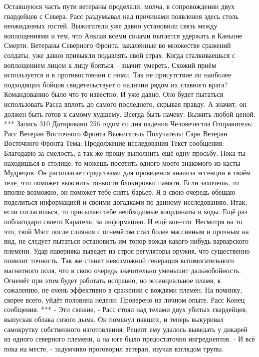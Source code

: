\documentclass[a4paper, 12pt]{report}
\begin{document}
Оставшуюся часть пути ветераны проделали, молча, в сопровождении двух гвардейцев с Севера. Расс раздумывал над причинами появления здесь столь неожиданных гостей. Выжигатели уже давно установили связь между воплощениями и тем, что Анклав всеми силами пытается удержать в Каньоне Смерти. Ветераны Северного Фронта, закалённые во множестве сражений солдаты, уже давно привыкли подавлять свой страх. Когда сталкиваешься с воплощением лицом к лицу бояться – значит умереть. Схожий приём используется и в противостоянии с ними. Так не присутствие ли наиболее подходящих бойцов свидетельствует о наличии рядом их главного врага? Командованию было что-то известно. И уже давно. Оно будет пытаться использовать Расса вплоть до самого последнего, скрывая правду. А значит, он должен быть готов к самому худшему. 
Всегда быть начеку. Выжить любой ценой.
***
Запись 310
Датировано 256 годом со дня падения Человечества
Отправитель: Расс Ветеран Восточного Фронта Выжигатель
Получатель: Сарн Ветеран Восточного Фронта
Тема: Продолжение исследования
Текст сообщения:	
	Благодарю за смелость, а так же прошу выполнить ещё одну просьбу. Пока ты находишься в столице, то можешь посетить одного моего знакомого из касты Мудрецов. Он располагает средствами для проведения анализа эссенции в твоём теле, что поможет выяснить тонкости блокировки памяти. Если захочешь, то вполне возможно, он поможет тебе снять барьер. Я в свою очередь обещаю поделиться информацией и своими догадками по данному исследованию. 
Итак, если согласишься, то присылаю тебе необходимые координаты и коды.
Ещё раз поблагодари своего Карателя, за информацию.
	И ещё кое-что. Несмотря на то что, твой Мэгг после слияния с огнемётом стал более массивным и прочным на вид, не следует пытаться остановить им топор вождя какого-нибудь варварского племени. Удар наверняка выведет из строя регуляторы оружия, что существенно понизит точность. Так же станет невозможной генерация вспомогательного магнитного поля, что в свою очередь значительно уменьшит дальнобойность. Огнемёт при этом будет работать исправно, но эссенциальное пламя, к сожалению, не очень эффективно в сражении с вождями племён. На починку, скорее всего, уйдёт половина недели. 
Проверено на личном опыте.
Расс
Конец сообщения. 
***
	- Эти свежие, - Расс стоял над телами двух убитых гвардейцев, выпуская облака сизого дыма. Он помянул павших, и теперь выкуривал самокрутку собственного изготовления. Рецепт ему удалось выведать у дикарей из одного северного племени, а на юге было предостаточно ингредиентов.
	- И всё пока на месте, - задумчиво проговорил ветеран, изучая взглядом трупы. 
\end{document}

